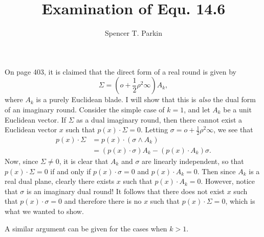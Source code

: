 \documentclass[12pt]{article}
\title{Examination of Equ. 14.6}
\author{Spencer T. Parkin}
\newcommand{\nvao}{o}
\newcommand{\nvai}{\infty}
\begin{document}
\maketitle

On page 403, it is claimed that the direct form of a real round is given by
\begin{equation*}
\Sigma = \left(\nvao+\frac{1}{2}\rho^2\nvai\right)A_k,
\end{equation*}
where $A_k$ is a purely Euclidean blade.  I will show that this is \emph{also} the
dual form of an imaginary round.  Consider the simple case of $k=1$,
and let $A_k$ be a unit Euclidean vector.  If $\Sigma$ as a
dual imaginary round, then there cannot exist a Euclidean vector $x$
such that $p(x)\cdot\Sigma=0$.  Letting $\sigma=\nvao+\frac{1}{2}\rho^2\nvai$,
we see that
\begin{align*}
p(x)\cdot\Sigma &= p(x)\cdot(\sigma\wedge A_k) \\
 &= (p(x)\cdot\sigma)A_k - (p(x)\cdot A_k)\sigma.
\end{align*}
Now, since $\Sigma\neq 0$, it is clear that $A_k$ and $\sigma$ are linearly independent,
so that $p(x)\cdot\Sigma=0$ if and only if $p(x)\cdot\sigma=0$ and $p(x)\cdot A_k=0$.
Then since $A_k$ is a real dual plane, clearly there exists $x$ such that $p(x)\cdot A_k=0$.
However, notice that $\sigma$ is an imaginary dual round!  It follows that there does not
exist $x$ such that $p(x)\cdot\sigma=0$ and therefore there is no $x$ such that $p(x)\cdot\Sigma=0$,
which is what we wanted to show.

A similar argument can be given for the cases when $k>1$.
\end{document}
